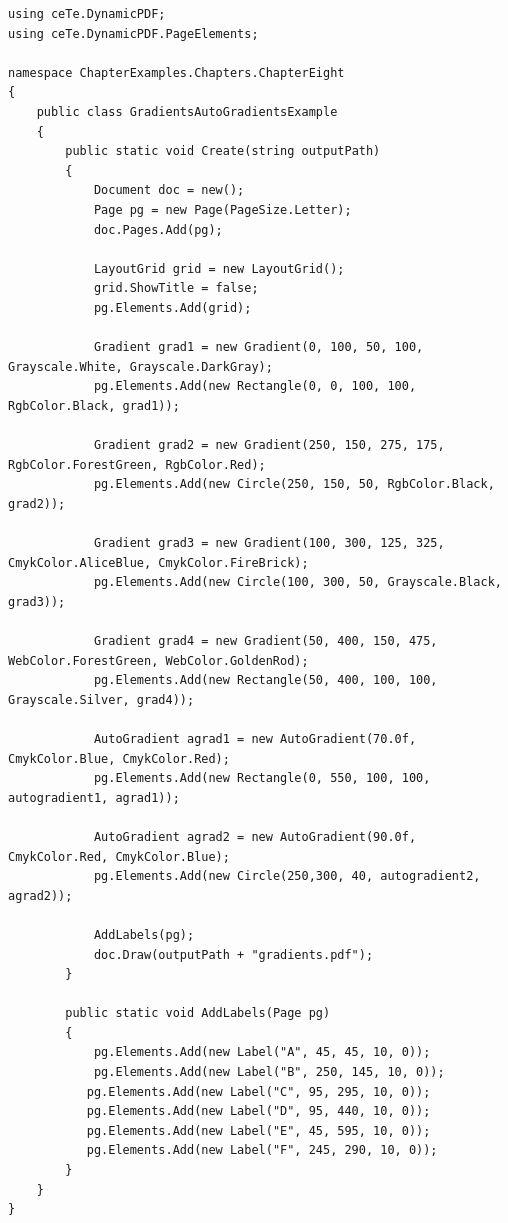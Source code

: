 \documentclass[american,letterpaper]{tufte-book}
\numberwithin{equation}{section}
\numberwithin{figure}{section}
\begin{document}
{\bgroup{}
\begin{lstlisting}[caption={Gradients in a PDF document.},label={lis:Gradients-in-a},basicstyle={\small\ttfamily},breaklines=true]
using ceTe.DynamicPDF;
using ceTe.DynamicPDF.PageElements;

namespace ChapterExamples.Chapters.ChapterEight
{
    public class GradientsAutoGradientsExample
    {
        public static void Create(string outputPath)
        {
            Document doc = new();
            Page pg = new Page(PageSize.Letter);
            doc.Pages.Add(pg);

            LayoutGrid grid = new LayoutGrid();
            grid.ShowTitle = false;
            pg.Elements.Add(grid);

            Gradient grad1 = new Gradient(0, 100, 50, 100, Grayscale.White, Grayscale.DarkGray);
            pg.Elements.Add(new Rectangle(0, 0, 100, 100, RgbColor.Black, grad1));
            
            Gradient grad2 = new Gradient(250, 150, 275, 175, RgbColor.ForestGreen, RgbColor.Red);
            pg.Elements.Add(new Circle(250, 150, 50, RgbColor.Black, grad2));
            
            Gradient grad3 = new Gradient(100, 300, 125, 325, CmykColor.AliceBlue, CmykColor.FireBrick);
            pg.Elements.Add(new Circle(100, 300, 50, Grayscale.Black, grad3));
           
            Gradient grad4 = new Gradient(50, 400, 150, 475, WebColor.ForestGreen, WebColor.GoldenRod);
            pg.Elements.Add(new Rectangle(50, 400, 100, 100, Grayscale.Silver, grad4));
            
            AutoGradient agrad1 = new AutoGradient(70.0f, CmykColor.Blue, CmykColor.Red);            
            pg.Elements.Add(new Rectangle(0, 550, 100, 100, autogradient1, agrad1));
            
            AutoGradient agrad2 = new AutoGradient(90.0f, CmykColor.Red, CmykColor.Blue);
            pg.Elements.Add(new Circle(250,300, 40, autogradient2, agrad2));

            AddLabels(pg);
            doc.Draw(outputPath + "gradients.pdf");
        }

        public static void AddLabels(Page pg)
        {
            pg.Elements.Add(new Label("A", 45, 45, 10, 0));
            pg.Elements.Add(new Label("B", 250, 145, 10, 0));
           pg.Elements.Add(new Label("C", 95, 295, 10, 0));
           pg.Elements.Add(new Label("D", 95, 440, 10, 0));
           pg.Elements.Add(new Label("E", 45, 595, 10, 0));
           pg.Elements.Add(new Label("F", 245, 290, 10, 0));
        }
    }
}
\end{lstlisting}
\leavevmode\egroup


}
\end{document}
